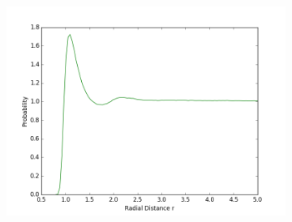 \begin{figure}[ht]
\begin{subfigure}{0.3\textwidth}
\includegraphics[width=\textwidth]{fig/meanRDF_T2d0.png}
\end{subfigure}
\end{figure}

